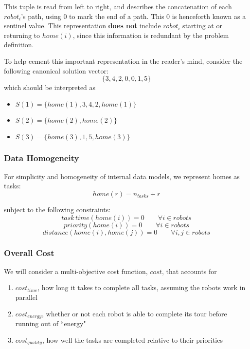 \documentclass[a4paper]{article}
\begin{document}
This tuple is read from left to right, and describes the concatenation of each $robot_i$'s path, using 0 to mark the end of a path. This 0 is henceforth known as a sentinel value. This representation \textbf{does not} include $robot_i$ starting at or returning to $\mathit{home}(i)$, since this information is redundant by the problem definition.

To help cement this important representation in the reader's mind, consider the following canonical solution vector:
$$
\{3,4,2,0,0,1,5\}
$$
which should be interpreted as
\begin{itemize}
\item $S(1) = \{ \mathit{home}(1), 3, 4, 2, \mathit{home}(1) \}$
\item $S(2) = \{ \mathit{home}(2), \mathit{home}(2) \}$
\item $S(3) = \{ \mathit{home}(3), 1, 5, \mathit{home}(3) \}$
\end{itemize}

\subsubsection{Data Homogeneity}

For simplicity and homogeneity of internal data models, we represent homes as tasks:
$$\mathit{home}(r) = n_\mathit{tasks} + r$$

subject to the following constraints:
$$
\mathit{task\,time}(\mathit{home}(i)) = 0 \qquad \forall i \in \mathit{robots}
$$
$$
\mathit{priority}(\mathit{home}(i)) = 0 \qquad \forall i \in \mathit{robots}
$$
$$
\mathit{distance}(\mathit{home}(i), \mathit{home}(j)) = 0 \qquad \forall i, j \in \mathit{robots}
$$


\subsubsection{Overall Cost}

We will consider a multi-objective cost function, $\mathit{cost}$, that accounts for
\begin{enumerate}
\item $\mathit{cost}_\mathit{time}$, how long it takes to complete all tasks, assuming the robots work in parallel
\item $\mathit{cost}_\mathit{energy}$, whether or not each robot is able to complete its tour before running out of ``energy"
\item $\mathit{cost}_\mathit{quality}$, how well the tasks are completed relative to their priorities
\end{enumerate}
\end{document}
